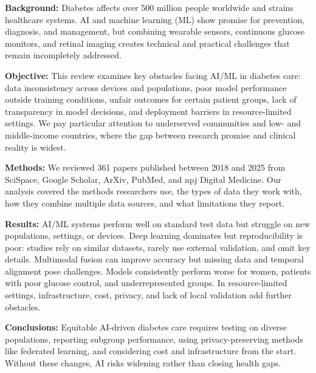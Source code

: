 \textbf{Background:} Diabetes affects over 500 million people worldwide and strains healthcare systems. AI and machine learning (ML) show promise for prevention, diagnosis, and management, but combining wearable sensors, continuous glucose monitors, and retinal imaging creates technical and practical challenges that remain incompletely addressed.

\textbf{Objective:} This review examines key obstacles facing AI/ML in diabetes care: data inconsistency across devices and populations, poor model performance outside training conditions, unfair outcomes for certain patient groups, lack of transparency in model decisions, and deployment barriers in resource-limited settings. We pay particular attention to underserved communities and low- and middle-income countries, where the gap between research promise and clinical reality is widest.

\textbf{Methods:} We reviewed 361 papers published between 2018 and 2025 from SciSpace, Google Scholar, ArXiv, PubMed, and npj Digital Medicine. Our analysis covered the methods researchers use, the types of data they work with, how they combine multiple data sources, and what limitations they report.

\textbf{Results:} AI/ML systems perform well on standard test data but struggle on new populations, settings, or devices. Deep learning dominates but reproducibility is poor: studies rely on similar datasets, rarely use external validation, and omit key details. Multimodal fusion can improve accuracy but missing data and temporal alignment pose challenges. Models consistently perform worse for women, patients with poor glucose control, and underrepresented groups. In resource-limited settings, infrastructure, cost, privacy, and lack of local validation add further obstacles.

\textbf{Conclusions:} Equitable AI-driven diabetes care requires testing on diverse populations, reporting subgroup performance, using privacy-preserving methods like federated learning, and considering cost and infrastructure from the start. Without these changes, AI risks widening rather than closing health gaps.
